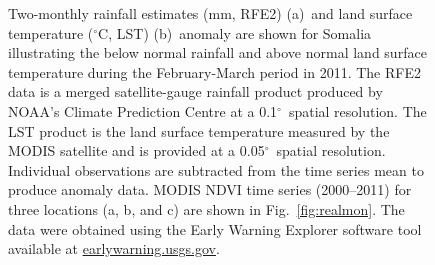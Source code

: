 \documentclass[authoryear,preprint,review,10pt]{elsarticle}
\newcommand{\degree}{\ensuremath{^\circ}}
\begin{document}
\begin{figure} [htp]
\centering
{} 
 \caption{Two-monthly rainfall estimates (mm, RFE2) (a)~and land surface temperature (\degree C, LST) (b)~anomaly are shown for Somalia illustrating the below normal rainfall and above normal land surface temperature during the February-March period in 2011. The RFE2 data is a merged satellite-gauge rainfall product produced by NOAA's Climate Prediction Centre at a 0.1\degree~spatial resolution. The LST product is the land surface temperature measured by the MODIS satellite and is provided at a 0.05\degree~spatial resolution. Individual observations are subtracted from the time series mean to produce anomaly data. MODIS NDVI time series (2000--2011) for three locations (a, b, and c) are shown in Fig.~\ref{fig:realmon}. The data were obtained using the Early Warning Explorer software tool available at \url{earlywarning.usgs.gov}. }
 \label{fig:RF_LSTSomalia}
\end{figure}
\end{document}
